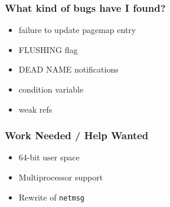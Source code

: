 \documentclass{beamer}
\begin{document}
\begin{frame}
\frametitle{What kind of bugs have I found?}
\begin{itemize}
\item failure to update pagemap entry
\item FLUSHING flag
\item DEAD NAME notifications
\item condition variable
\item weak refs
\end{itemize}
\end{frame}

\begin{frame}
\frametitle{Work Needed / Help Wanted}
\begin{itemize}
\item 64-bit user space
\item Multiprocessor support
\item Rewrite of {\tt netmsg}
\end{itemize}
\end{frame}


\end{document}
